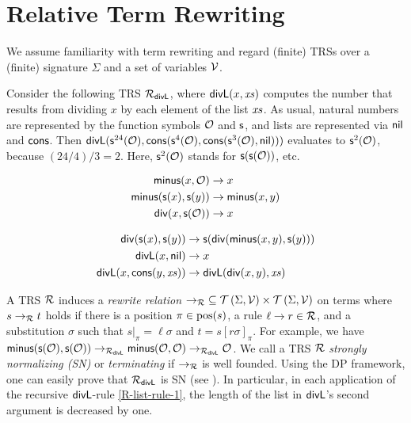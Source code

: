 \section{Relative Term Rewriting}\label{Relative Term Rewriting}

We assume familiarity with term rewriting \cite{baader_nipkow_1999} and regard (finite) TRSs
over a (finite) signature $\Sigma$ and a set of variables $\mathcal{V}$.

\begin{example}\label{ex:divlTRS}
Consider the following TRS $\mathcal{R}_{\mathsf{divL}}$, where $\mathsf{divL}(x,\mathit{xs})$ computes the
number that results from dividing $x$ by each element of the list $\mathit{xs}$. 
As usual, natural numbers are 
represented by the function symbols $\mathcal{O}$ and $\mathsf{s}$, and lists are represented via $\mathsf{nil}$
and $\mathsf{cons}$. 
Then $\mathsf{divL}(\mathsf{s}^{24}(\mathcal{O}), \mathsf{cons}(\mathsf{s}^4(\mathcal{O}), \mathsf{cons}(\mathsf{s}^3(\mathcal{O}),\mathsf{nil})))$ evaluates to
$\mathsf{s}^2(\mathcal{O})$, because $(24/4)/3 = 2$. Here, $\mathsf{s}^2(\mathcal{O})$ stands for $\mathsf{s}(\mathsf{s}(\mathcal{O}))$, etc.

\vspace*{-0.5cm}

{\footnotesize
\hspace*{-0.85cm}
\begin{minipage}[t]{5.1cm}
    \begin{align}
        \label{R-minus-rule-2} \mathsf{minus}(x,\mathcal{O}) &\to x\\
        \label{R-minus-rule-1} \mathsf{minus}(\mathsf{s}(x),\mathsf{s}(y)) &\to \mathsf{minus}(x,y) \\
        \label{R-div-rule-1} \mathsf{div}(x,\mathsf{s}(\mathcal{O})) &\to x\!
    \end{align}
\end{minipage}\hspace{.3cm}
\begin{minipage}[t]{7.1cm}
    \begin{align}
        \label{R-div-rule-2} \mathsf{div}(\mathsf{s}(x),\mathsf{s}(y)) &\to \mathsf{s}(\mathsf{div}(\mathsf{minus}(x,y),\mathsf{s}(y)))\\
        \label{R-list-rule-2} \mathsf{divL}(x,\mathsf{nil}) &\to x \\
        \label{R-list-rule-1} \mathsf{divL}(x,\mathsf{cons}(y,\mathit{xs})) &\to \mathsf{divL}(\mathsf{div}(x,y),\mathit{xs}) \!
         \end{align}
\end{minipage}}
\end{example}

\smallskip

\noindent 
A TRS $\mathcal{R}$ induces a \emph{rewrite relation} ${\to_{\mathcal{R}}} \subseteq \mathcal{T}\left(\Sigma,\mathcal{V}\right)
\times \mathcal{T}\left(\Sigma,\mathcal{V}\right)$ on terms where $s \to_{\mathcal{R}} t$ holds if there is a position
 $\pi \in \mathrm{pos}(s)$, 
a rule $\ell \to r \in \mathcal{R}$, and a substitution $\sigma$ such that $s|_{\pi}=\ell\sigma$ and $t = s[r\sigma]_{\pi}$.
For example, we have $\mathsf{minus}(\mathsf{s}(\mathcal{O}),\mathsf{s}(\mathcal{O})) \to_{\mathcal{R}_{\mathsf{divL}}} \mathsf{minus}(\mathcal{O},\mathcal{O}) \to_{\mathcal{R}_{\mathsf{divL}}} \mathcal{O}$.
We call a TRS $\mathcal{R}$ \emph{strongly normalizing (SN)} or \emph{terminating} if $\to_{\mathcal{R}}$ is
well founded. Using the DP framework, one can easily prove that
$\mathcal{R}_{\mathsf{divL}}$ is SN (see ). In
particular, in each application of the recursive $\mathsf{divL}$-rule 
\eqref{R-list-rule-1}, the length of the list in $\mathsf{divL}$'s second argument is
decreased by one.

